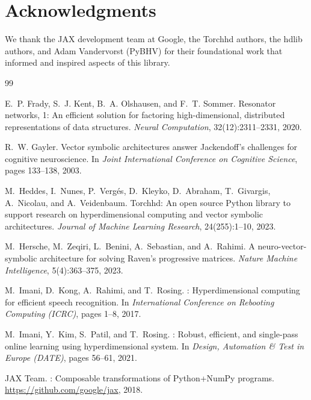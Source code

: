 \documentclass[twoside,11pt]{article}
\begin{document}
\section*{Acknowledgments}

We thank the JAX development team at Google, the Torchhd authors, the hdlib authors, and Adam Vandervorst (PyBHV) for their foundational work that informed and inspired aspects of this library.


\begin{thebibliography}{99}

E.~P. Frady, S.~J. Kent, B.~A. Olshausen, and F.~T. Sommer.
\newblock Resonator networks, 1: An efficient solution for factoring high-dimensional, distributed representations of data structures.
\newblock \textit{Neural Computation}, 32(12):2311--2331, 2020.

R.~W. Gayler.
\newblock Vector symbolic architectures answer {J}ackendoff's challenges for cognitive neuroscience.
\newblock In \textit{Joint International Conference on Cognitive Science}, pages 133--138, 2003.

M.~Heddes, I.~Nunes, P.~Verg\'es, D.~Kleyko, D.~Abraham, T.~Givargis, A.~Nicolau, and A.~Veidenbaum.
\newblock Torchhd: An open source {P}ython library to support research on hyperdimensional computing and vector symbolic architectures.
\newblock \textit{Journal of Machine Learning Research}, 24(255):1--10, 2023.

M.~Hersche, M.~Zeqiri, L.~Benini, A.~Sebastian, and A.~Rahimi.
\newblock A neuro-vector-symbolic architecture for solving {R}aven's progressive matrices.
\newblock \textit{Nature Machine Intelligence}, 5(4):363--375, 2023.

M.~Imani, D.~Kong, A.~Rahimi, and T.~Rosing.
: Hyperdimensional computing for efficient speech recognition.
\newblock In \textit{International Conference on Rebooting Computing (ICRC)}, pages 1--8, 2017.

M.~Imani, Y.~Kim, S.~Patil, and T.~Rosing.
: Robust, efficient, and single-pass online learning using hyperdimensional system.
\newblock In \textit{Design, Automation \& Test in Europe (DATE)}, pages 56--61, 2021.

JAX Team.
: Composable transformations of {P}ython+{N}um{P}y programs.
\newblock \url{https://github.com/google/jax}, 2018.


\end{thebibliography}
\end{document}
